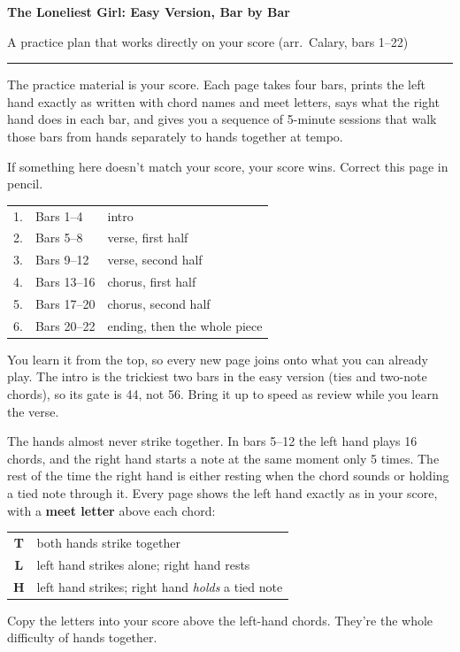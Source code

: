 \documentclass[10pt]{article}
\newcommand{\sect}[1]{\par\vspace{5pt}{\large\bfseries #1}\par\vspace{2pt}}
\newcommand{\T}{\textbf{T}}\newcommand{\Lx}{\textbf{L}}\newcommand{\Hx}{\textbf{H}}
\begin{document}
{\fontsize{24}{26}\selectfont\bfseries The Loneliest Girl: Easy Version, Bar by Bar}\par\vspace{2pt}
{\large A practice plan that works directly on your score (arr.\ Calary, bars 1--22)}\par
\vspace{2pt}\noindent\rule{\textwidth}{0.8pt}\par\vspace{2pt}

\begin{minipage}[t]{0.485\textwidth}
\sect{How this works}
The practice material is your score. Each page takes four bars, prints the left hand exactly as written with chord names and meet letters, says what the right hand does in each bar, and gives you a sequence of 5-minute sessions that walk those bars from hands separately to hands together at tempo.

If something here doesn't match your score, your score wins. Correct this page in pencil.

\sect{Order: the order of the piece}
\renewcommand{\arraystretch}{1.15}
\begin{tabular}{@{}l l l@{}}
1. & Bars 1--4 & intro\\
2. & Bars 5--8 & verse, first half\\
3. & Bars 9--12 & verse, second half\\
4. & Bars 13--16 & chorus, first half\\
5. & Bars 17--20 & chorus, second half\\
6. & Bars 20--22 & ending, then the whole piece\\
\end{tabular}\par
You learn it from the top, so every new page joins onto what you can already play. The intro is the trickiest two bars in the easy version (ties and two-note chords), so its gate is 44, not 56. Bring it up to speed as review while you learn the verse.

\sect{The one thing that makes this piece hard}
The hands almost never strike together. In bars 5--12 the left hand plays 16 chords, and the right hand starts a note at the same moment only 5 times. The rest of the time the right hand is either resting when the chord sounds or holding a tied note through it. Every page shows the left hand exactly as in your score, with a \textbf{meet letter} above each chord:\par\vspace{2pt}
\begin{tabular}{@{}c l@{}}
\T & both hands strike together\\
\Lx & left hand strikes alone; right hand rests\\
\Hx & left hand strikes; right hand \emph{holds} a tied note\\
\end{tabular}\par
Copy the letters into your score above the left-hand chords. They're the whole difficulty of hands together.


\end{minipage}
\end{document}
